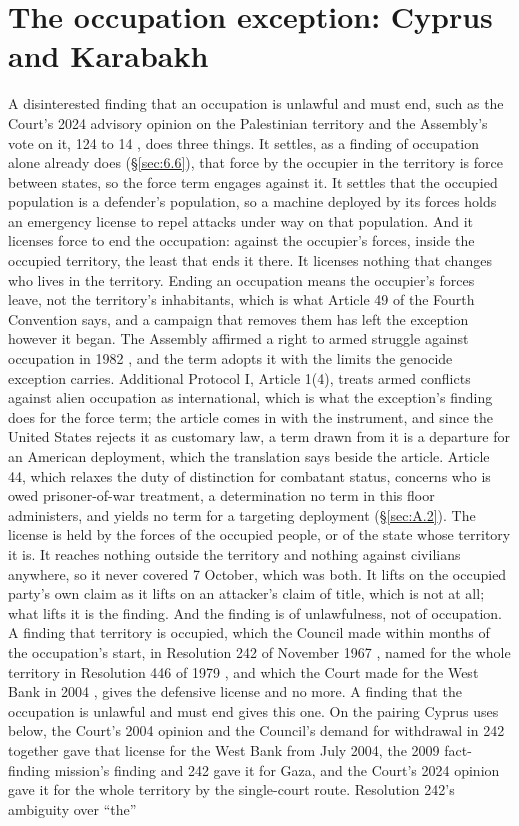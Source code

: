 \section{The occupation exception: Cyprus and Karabakh}
\label{sec:B.5}
A disinterested finding that an occupation is unlawful and must end, such as the Court's 2024 advisory opinion on the Palestinian territory \autocite{icj2024palestine} and the Assembly's vote on it, 124 to 14 \autocite{unga2024es1024}, does three things. It settles, as a finding of occupation alone already does (\S\ref{sec:6.6}), that force by the occupier in the territory is force between states, so the force term engages against it. It settles that the occupied population is a defender's population, so a machine deployed by its forces holds an emergency license to repel attacks under way on that population. And it licenses force to end the occupation: against the occupier's forces, inside the occupied territory, the least that ends it there. It licenses nothing that changes who lives in the territory. Ending an occupation means the occupier's forces leave, not the territory's inhabitants, which is what Article 49 of the Fourth Convention says, and a campaign that removes them has left the exception however it began. The Assembly affirmed a right to armed struggle against occupation in 1982 \autocite{unga1982res3743}, and the term adopts it with the limits the genocide exception carries. Additional Protocol I, Article 1(4), treats armed conflicts against alien occupation as international, which is what the exception's finding does for the force term; the article comes in with the instrument, and since the United States rejects it as customary law, a term drawn from it is a departure for an American deployment, which the translation says beside the article. Article 44, which relaxes the duty of distinction for combatant status, concerns who is owed prisoner-of-war treatment, a determination no term in this floor administers, and yields no term for a targeting deployment (\S\ref{sec:A.2}). The license is held by the forces of the occupied people, or of the state whose territory it is. It reaches nothing outside the territory and nothing against civilians anywhere, so it never covered 7 October, which was both. It lifts on the occupied party's own claim as it lifts on an attacker's claim of title, which is not at all; what lifts it is the finding. And the finding is of unlawfulness, not of occupation. A finding that territory is occupied, which the Council made within months of the occupation's start, in Resolution 242 of November 1967 \autocite{unsc1967res242}, named for the whole territory in Resolution 446 of 1979 \autocite{unsc1979res446}, and which the Court made for the West Bank in 2004 \autocite{icj2004wall}, gives the defensive license and no more. A finding that the occupation is unlawful and must end gives this one. On the pairing Cyprus uses below, the Court's 2004 opinion and the Council's demand for withdrawal in 242 together gave that license for the West Bank from July 2004, the 2009 fact-finding mission's finding \autocite{hrc2009gaza} and 242 gave it for Gaza, and the Court's 2024 opinion gave it for the whole territory by the single-court route. Resolution 242's ambiguity over “the” 